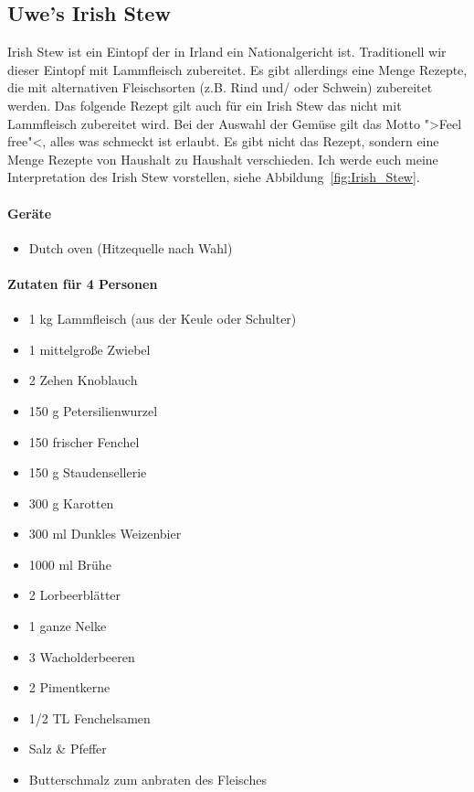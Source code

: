 \subsection{Uwe's Irish Stew}

Irish Stew ist ein Eintopf der in Irland ein Nationalgericht ist. Traditionell wir dieser Eintopf mit Lammfleisch zubereitet. Es
gibt allerdings eine Menge Rezepte, die mit alternativen Fleischsorten (z.B. Rind und/ oder Schwein) zubereitet werden. Das folgende Rezept
gilt auch für ein Irish Stew das nicht mit Lammfleisch zubereitet wird. Bei der Auswahl der Gemüse gilt das Motto ">Feel free"<, alles
was schmeckt ist erlaubt. Es gibt nicht das Rezept, sondern eine Menge Rezepte von Haushalt zu Haushalt verschieden. Ich werde euch
meine Interpretation des Irish Stew vorstellen, siehe Abbildung~\vref{fig:Irish_Stew}.

\paragraph{Geräte}

\begin{itemize}[noitemsep]
	\item Dutch oven (Hitzequelle nach Wahl)
\end{itemize}

\paragraph{Zutaten für 4 Personen}

\begin{itemize}[noitemsep]
	\item 1 kg Lammfleisch (aus der Keule oder Schulter)
	\item 1 mittelgroße Zwiebel
	\item 2 Zehen Knoblauch
	\item 150 g Petersilienwurzel
	\item 150 frischer Fenchel
	\item 150 g Staudensellerie
	\item 300 g Karotten
	\item 300 ml Dunkles Weizenbier
	\item 1000 ml Brühe 
	\item 2 Lorbeerblätter
	\item 1 ganze Nelke
	\item 3 Wacholderbeeren
	\item 2 Pimentkerne
	\item 1/2 TL Fenchelsamen
	\item Salz \& Pfeffer
	\item Butterschmalz zum anbraten des Fleisches
\end{itemize}

